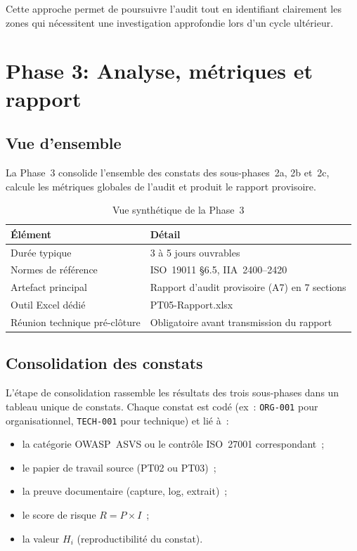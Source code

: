 \documentclass[12pt,a4paper,oneside]{report}
\begin{document}
Cette approche permet de poursuivre l'audit tout en identifiant 
clairement les zones qui nécessitent une investigation approfondie 
lors d'un cycle ultérieur.
\section{Phase 3: Analyse, m\'etriques et rapport}
\label{sec:phase3}

\subsection{Vue d'ensemble}

La Phase~3 consolide l'ensemble des constats des sous-phases~2a, 2b et~2c,
calcule les m\'etriques globales de l'audit et produit le rapport provisoire.

\begin{table}[H]
	\centering\small
	\caption{Vue synth\'etique de la Phase~3}
	\label{tab:vue_p3}
	\begin{tabularx}{\textwidth}{p{3.5cm}X}
		\toprule
		\rowcolor{theadcolor}
		\color{white}\textbf{\'El\'ement} &
		\color{white}\textbf{D\'etail} \\
		\midrule
		Dur\'ee typique & 3 \`a 5 jours ouvrables \\
		Normes de r\'ef\'erence & ISO~19011 §6.5, IIA~2400--2420 \\
		Artefact principal & Rapport d'audit provisoire (A7) en 7 sections \\
		Outil Excel d\'edi\'e & PT05-Rapport.xlsx \\
		R\'eunion technique pr\'e-cl\^oture & Obligatoire avant transmission du rapport \\
		\bottomrule
	\end{tabularx}
\end{table}

\subsection{Consolidation des constats}

L'\'etape de consolidation rassemble les r\'esultats des trois sous-phases
dans un tableau unique de constats. Chaque constat est cod\'e (ex~:
\texttt{ORG-001} pour organisationnel, \texttt{TECH-001} pour technique)
et li\'e \`a~:

\begin{itemize}[label={\color{gold}}, leftmargin=*, itemsep=2pt]
	\item la cat\'egorie OWASP~ASVS ou le contr\^ole ISO~27001 correspondant~;
	\item le papier de travail source (PT02 ou PT03)~;
	\item la preuve documentaire (capture, log, extrait)~;
	\item le score de risque $R = P \times I$~;
	\item la valeur $H_i$ (reproductibilit\'e du constat).
\end{itemize}
\end{document}

